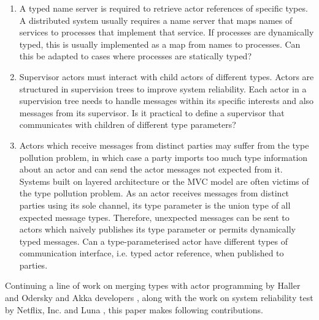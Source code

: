 \begin{enumerate}
  \item A typed name server is required to retrieve actor references of
specific types.  A distributed system usually requires a name server that
maps names of services to processes that implement that service.  If processes
are dynamically typed, this is usually implemented as a map from names to 
processes. Can this be adapted to cases where processes are statically 
typed?

  \item Supervisor actors must interact with child actors of different types.  
Actors are structured in supervision trees to improve system reliability.  Each 
actor in a supervision tree needs to handle messages within its specific 
interests and also messages from its supervisor.  Is it practical to define a 
supervisor that communicates with children of different type parameters?

  \item Actors which receive messages from distinct parties may suffer from 
the type pollution problem, in which case a party imports too much type  
information about an actor and can send the actor messages not expected from it.
Systems built on layered architecture or the MVC model are often victims of the 
type pollution problem. As an actor receives messages from distinct parties 
using its sole channel, its type parameter is the union type of all expected 
message types.  Therefore, unexpected messages can be sent to actors which 
naively publishes its type parameter or permits dynamically typed messages. 
Can a type-parameterised actor have different types of communication interface, 
i.e. typed actor reference, when published to parties.
\end{enumerate}

Continuing a line of work on merging types with actor programming by Haller
and Odersky \cite{actor_1, actor_2} and Akka developers \cite{akka_doc}, along 
with the work on system reliability test by Netflix, Inc. \cite{ChaosMonkey} 
and Luna \cite{ErlangChaosMonkey}, this paper makes following contributions.

